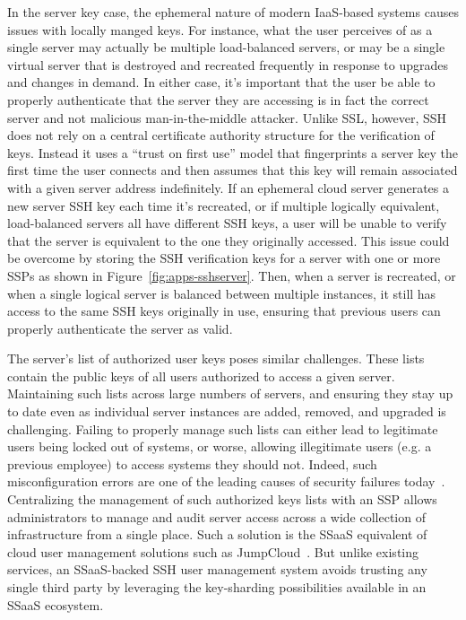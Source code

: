 In the server key case, the ephemeral nature of modern IaaS-based
systems causes issues with locally manged keys. For instance, what the
user perceives of as a single server may actually be multiple
load-balanced servers, or may be a single virtual server that is
destroyed and recreated frequently in response to upgrades and changes
in demand. In either case, it's important that the user be able to
properly authenticate that the server they are accessing is in fact
the correct server and not malicious man-in-the-middle
attacker. Unlike SSL, however, SSH does not rely on a central
certificate authority structure for the verification of keys. Instead
it uses a ``trust on first use'' model that fingerprints a server key
the first time the user connects and then assumes that this key will
remain associated with a given server address indefinitely. If an
ephemeral cloud server generates a new server SSH key each time it's
recreated, or if multiple logically equivalent, load-balanced servers
all have different SSH keys, a user will be unable to verify that the
server is equivalent to the one they originally accessed. This issue
could be overcome by storing the SSH verification keys for a server
with one or more SSPs as shown in
Figure~\ref{fig:apps-sshserver}. Then, when a server is recreated, or
when a single logical server is balanced between multiple instances,
it still has access to the same SSH keys originally in use, ensuring
that previous users can properly authenticate the server as valid.

The server's list of authorized user keys poses similar
challenges. These lists contain the public keys of all users
authorized to access a given server. Maintaining such lists across
large numbers of servers, and ensuring they stay up to date even as
individual server instances are added, removed, and upgraded is
challenging. Failing to properly manage such lists can either lead to
legitimate users being locked out of systems, or worse, allowing
illegitimate users (e.g. a previous employee) to access systems they
should not. Indeed, such misconfiguration errors are one of the
leading causes of security failures today~\cite{bishop1996,
  kerravala2002}. Centralizing the management of such authorized keys
lists with an SSP allows administrators to manage and audit server
access across a wide collection of infrastructure from a single
place. Such a solution is the SSaaS equivalent of cloud user
management solutions such as JumpCloud~\cite{jumpcloud}. But unlike
existing services, an SSaaS-backed SSH user management system avoids
trusting any single third party by leveraging the key-sharding
possibilities available in an SSaaS ecosystem.


